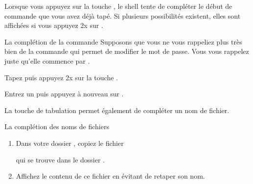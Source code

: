 \documentclass[a4paper,11pt]{style-esi/td}
\begin{document}
			Lorsque vous appuyez sur la touche , 
			le shell tente de compléter le début de commande 
			que vous avez déjà tapé. 
			Si plusieurs possibilités existent, 
			elles sont affichées si vous appuyez 2x sur .  

			\begin{Tutoriel}{La complétion de la commande} 
				Supposons que vous ne vous rappeliez plus très bien 
				de la commande qui permet de modifier le mot de passe.
				Vous vous rappelez juste qu'elle commence par .  
				\begin{steps}
				\item 
					Tapez  puis appuyez 2x sur la touche .
				\item 
					Entrez un  puis appuyez à nouveau sur .
				\end{steps}
			\end{Tutoriel}		
			
			\medskip
			La touche de tabulation permet également de compléter un nom de fichier.

			\begin{Exercice}{La complétion des noms de fichiers}  
				\vspace{-1em}          
				\begin{enumerate}
				\item 
					Dans votre dossier , 
					copiez le fichier \par
					qui se trouve dans le dossier .
				\item 
					Affichez le contenu de ce fichier en évitant de retaper son nom.
				\end{enumerate}
			\end{Exercice}	
			
					
	
\end{document}
